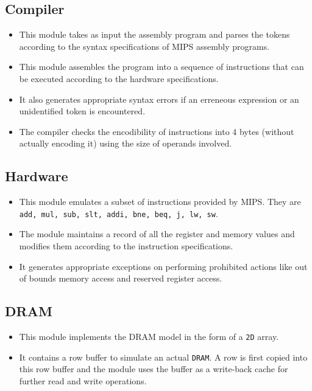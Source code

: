 \documentclass[hidelinks,12pt]{article}
\begin{document}
\subsection{Compiler}
\begin{itemize}
    \item This module takes as input the assembly program and parses the tokens according to the syntax specifications of MIPS assembly programs.
    \item This module assembles the program into a sequence of instructions that can be executed according to the hardware specifications.
    \item It also generates appropriate syntax errors if an erreneous expression or an unidentified token is encountered.
    \item The compiler checks the encodibility of instructions into 4 bytes (without actually encoding it) using the size of operands involved.
\end{itemize}
\subsection{Hardware}
\begin{itemize}
    \item This module emulates a subset of instructions provided by MIPS. They are \verb|add, mul, sub, slt, addi, bne, beq, j, lw, sw|.
    \item The module maintains a record of all the register and memory values and modifies them according to the instruction specifications.
    \item It generates appropriate exceptions on performing prohibited actions like out of bounds memory access and reserved register access.
\end{itemize}

\subsection{DRAM}
\begin{itemize}
    \item This module implements the DRAM model in the form of a \verb|2D| array.
    \item It contains a row buffer to simulate an actual \verb|DRAM|. A row is first copied into this row buffer and the module uses the buffer as a write-back cache for further read and write operations.
\end{itemize}
\end{document}
